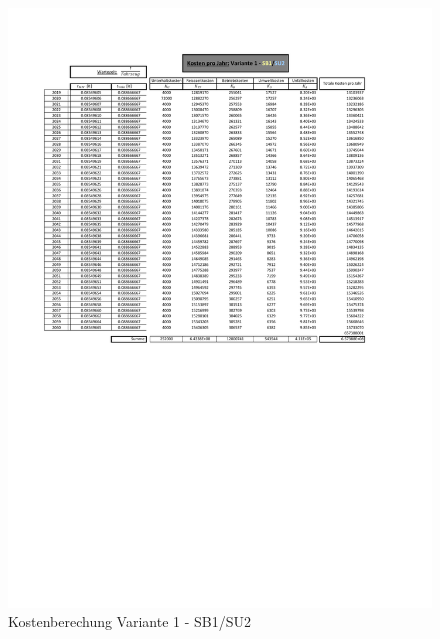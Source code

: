 \begin{figure}[h!]
	\centering
	\includegraphics[width=\textwidth]{figures/Anhang/f-00-A-V1-B1-U2}
	\caption{Kostenberechung Variante 1 - SB1/SU2}
\end{figure}

